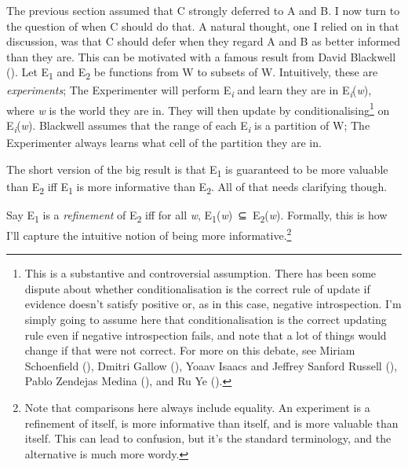 \documentclass[
  11pt,
  letterpaper,
  DIV=11,
  numbers=noendperiod,
  twoside]{scrartcl}
\begin{document}
The previous section assumed that C strongly deferred to A and B. I now
turn to the question of when C should do that. A natural thought, one I
relied on in that discussion, was that C should defer when they regard A
and B as better informed than they are. This can be motivated with a
famous result from David Blackwell ().
Let E\textsubscript{1} and E\textsubscript{2} be functions from W to
subsets of W. Intuitively, these are \emph{experiments}; The
Experimenter will perform E\textsubscript{\emph{i}} and learn they are
in E\emph{\textsubscript{i}}(\emph{w}), where \emph{w} is the world they
are in. They will then update by conditionalising\footnote{This is a
  substantive and controversial assumption. There has been some dispute
  about whether conditionalisation is the correct rule of update if
  evidence doesn't satisfy positive or, as in this case, negative
  introspection. I'm simply going to assume here that conditionalisation
  is the correct updating rule even if negative introspection fails, and
  note that a lot of things would change if that were not correct. For
  more on this debate, see Miriam Schoenfield
  (), Dmitri Gallow
  (), Yoaav Isaacs and Jeffrey Sanford
  Russell (), Pablo Zendejas Medina
  (), and Ru Ye
  ().} on
E\emph{\textsubscript{i}}(\emph{w}). Blackwell assumes that the range of
each E\textsubscript{\emph{i}} is a partition of W; The Experimenter
always learns what cell of the partition they are in.

The short version of the big result is that E\textsubscript{1} is
guaranteed to be more valuable than E\textsubscript{2} iff
E\textsubscript{1} is more informative than E\textsubscript{2}. All of
that needs clarifying though.

Say E\textsubscript{1} is a \emph{refinement} of E\textsubscript{2} iff
for all \emph{w},
E\textsubscript{1}(\emph{w})~⊆~E\textsubscript{2}(\emph{w}). Formally,
this is how I'll capture the intuitive notion of being more
informative.\footnote{Note that comparisons here always include
  equality. An experiment is a refinement of itself, is more informative
  than itself, and is more valuable than itself. This can lead to
  confusion, but it's the standard terminology, and the alternative is
  much more wordy.}
\end{document}

